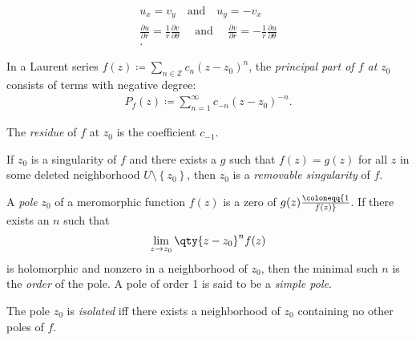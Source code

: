 \begin{definition}

\begin{align*}
u_x = v_y \quad\text{and}\quad u_y = -v_x \\
\frac{\partial u}{\partial r}=\frac{1}{r} \frac{\partial v}{\partial \theta} \quad \text { and } \quad \frac{\partial v}{\partial r}=-\frac{1}{r} \frac{\partial u}{\partial \theta} \\
.\end{align*}

\end{definition}

\begin{definition}

In a Laurent series
\(f(z) \coloneqq\sum_{n\in {\mathbb{Z}}} c_n (z-z_0)^n\), the
\emph{principal part of \(f\) at \(z_0\)} consists of terms with
negative degree:
\begin{align*}  
P_f(z) \coloneqq\sum_{n=1}^\infty c_{-n}(z-z_0)^{-n}
.\end{align*}

The \emph{residue} of \(f\) at \(z_0\) is the coefficient \(c_{-1}\).

\end{definition}

\begin{definition}

If \(z_0\) is a singularity of \(f\) and there exists a \(g\) such that
\(f(z) = g(z)\) for all \(z\) in some deleted neighborhood
\(U\setminus\left\{{z_0}\right\}\), then \(z_0\) is a \emph{removable
singularity} of \(f\).

\end{definition}

\begin{definition}

A \emph{pole} \(z_0\) of a meromorphic function \(f(z)\) is a zero of
\(g(z) \coloneqq{1\over f(z)}\). If there exists an \(n\) such that
\begin{align*}  
\lim_{z\to z_0}\qty{z-z_0}^nf(z)
\end{align*}
is holomorphic and nonzero in a neighborhood of \(z_0\), then the
minimal such \(n\) is the \emph{order} of the pole. A pole of order 1 is
said to be a \emph{simple pole}.

The pole \(z_0\) is \emph{isolated} iff there exists a neighborhood of
\(z_0\) containing no other poles of \(f\).

\end{definition}

